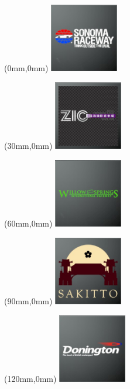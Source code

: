 \begin{textblock*}{30mm}(0mm,0mm)%
\includegraphics[width=30mm]{LG/2015-05-20_00096.png}
\end{textblock*}
\begin{textblock*}{30mm}(30mm,0mm)%
\includegraphics[width=30mm]{LG/2015-05-20_00099.png}
\end{textblock*}
\begin{textblock*}{30mm}(60mm,0mm)%
\includegraphics[width=30mm]{LG/2015-05-20_00098.png}
\end{textblock*}
\begin{textblock*}{30mm}(90mm,0mm)%
\includegraphics[width=30mm]{LG/2015-05-20_00093.png}
\end{textblock*}
\begin{textblock*}{30mm}(120mm,0mm)%
\includegraphics[width=30mm]{LG/2015-05-20_00080.png}
\end{textblock*}
